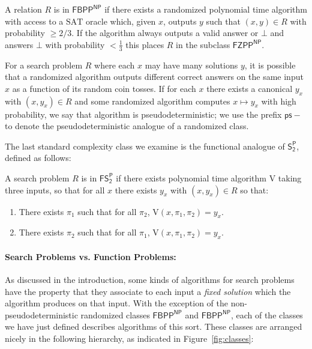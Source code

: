 \begin{definition}
A relation $R$ is in $\mathsf{FBPP^{NP}}$ if there exists a randomized polynomial time algorithm with access to a $\mathrm{SAT}$ oracle which, given $x$, outputs $y$ such that $(x,y) \in R$ with probability $\geq 2/3$. If the algorithm always outputs a valid answer or $\bot$ and answers $\bot$ with probability $< \frac{1}{3}$ this places $R$ in the subclass $\mathsf{FZPP^{NP}}$.

For a search problem $R$ where each $x$ may have many solutions $y$, it is possible that a randomized algorithm outputs different correct answers on the same input $x$ as a function of its random coin tosses. If for each $x$ there exists a canonical $y_x$ with $(x,y_x) \in R$ and some randomized algorithm computes $x \mapsto y_x$ with high probability, we say that algorithm is pseudodeterministic; we use the prefix $\mathsf{ps}-$ to denote the pseudodeterministic analogue of a randomized class.
\end{definition}
The last standard complexity class we examine is the functional analogue of $\mathsf{S_2^P}$, defined as follows:
\begin{definition}[$\mathsf{FS_2^P}$]
A search problem $R$ is in $\mathsf{FS_2^P}$ if there exists polynomial time algorithm $\mathrm{V}$ taking three inputs, so that for all $x$ there exists $y_x$ with $(x,y_x) \in R$ so that:
\begin{enumerate}
    \item There exists $\pi_1$ such that for all $\pi_2$, $\mathrm{V}(x,\pi_1,\pi_2)=y_x$.
    \item There exists $\pi_2$ such that for all $\pi_1$, $\mathrm{V}(x,\pi_1,\pi_2)=y_x$.
\end{enumerate}
\end{definition}

\paragraph{Search Problems vs. Function Problems:}
As discussed in the introduction, some kinds of algorithms for search problems have the property that they associate to each input a \emph{fixed solution} which the algorithm produces on that input. With the exception of the non-pseudodeterministic randomized classes $\mathsf{FBPP^{NP}}$ and $\mathsf{FBPP^{NP}}$, each of the classes we have just defined describes algorithms of this sort. These classes are arranged nicely in the following hierarchy, as indicated in Figure~\ref{fig:classes}:

